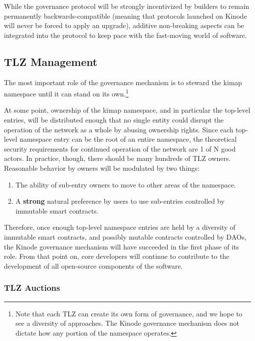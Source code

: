\documentclass[runningheads]{llncs}
\begin{document}
While the governance protocol will be strongly incentivized by builders to remain permanently backwards-compatible (meaning that protocols launched on Kinode will never be forced to apply an upgrade), additive non-breaking aspects can be integrated into the protocol to keep pace with the fast-moving world of software.

\subsection{TLZ Management}
\label{sec:tlzmanagement}

The most important role of the governance mechanism is to steward the kimap namespace until it can stand on its own.\footnote{Note that each TLZ can create its own form of governance, and we hope to see a diversity of approaches. The Kinode governance mechanism does not dictate how any portion of the namespace operates.}

At some point, ownership of the kimap namespace, and in particular the top-level entries, will be distributed enough that no single entity could disrupt the operation of the network as a whole by abusing ownership rights.
Since each top-level namespace entry can be the root of an entire namespace, the theoretical security requirements for continued operation of the network are 1 of N good actors.
In practice, though, there should be many hundreds of TLZ owners.
Reasonable behavior by owners will be modulated by two things:
\begin{enumerate}
    \item The ability of sub-entry owners to move to other areas of the namespace.
    \item A \textbf{strong} natural preference by users to use sub-entries controlled by immutable smart contracts.
\end{enumerate}

Therefore, once enough top-level namespace entries are held by a diversity of immutable smart contracts, and possibly mutable contracts controlled by DAOs, the Kinode governance mechanism will have succeeded in the first phase of its role.
From that point on, core developers will continue to contribute to the development of all open-source components of the software.

\subsubsection{TLZ Auctions}
\label{sec:tlzauctions}
\end{document}
